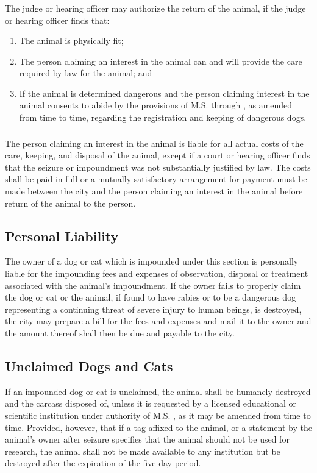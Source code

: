 \subsubsection{}
The judge or hearing officer may authorize the return of the animal, if the judge or hearing officer finds that:
\begin{enumerate}[{\indent}a)]
    \item The animal is physically fit;
    \item The person claiming an interest in the animal can and will provide the care required by law for the animal; and
    \item If the animal is determined dangerous and the person claiming interest in the animal consents to abide by the provisions of M.S.  through , as amended from time to time, regarding the registration and keeping of dangerous dogs.
\end{enumerate}
\subsubsection{}
The person claiming an interest in the animal is liable for all actual costs of the care, keeping, and disposal of the animal, except if a court or hearing officer finds that the seizure or impoundment was not substantially justified by law.  The costs shall be paid in full or a mutually satisfactory arrangement for payment must be made between the city and the person claiming an interest in the animal before return of the animal to the person.
\subsection{Personal Liability}
The owner of a dog or cat which is impounded under this section is personally liable for the impounding fees and expenses of observation, disposal or treatment associated with the animal’s impoundment.  If the owner fails to properly claim the dog or cat or the animal, if found to have rabies or to be a dangerous dog representing a continuing threat of severe injury to human beings, is destroyed, the city may prepare a bill for the fees and expenses and mail it to the owner and the amount thereof shall then be due and payable to the city.
\subsection{Unclaimed Dogs and Cats}
If an impounded dog or cat is unclaimed, the animal shall be humanely destroyed and the carcass disposed of, unless it is requested by a licensed educational or scientific institution under authority of M.S. , as it may be amended from time to time.  Provided, however, that if a tag affixed to the animal, or a statement by the animal’s owner after seizure specifies that the animal should not be used for research, the animal shall not be made available to any institution but be destroyed after the expiration of the five-day period.
